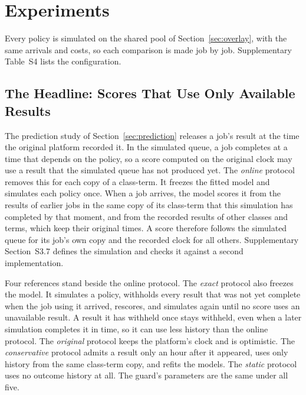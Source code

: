 \providecommand{\devnum}[1]{#1}

\section{Experiments}
\label{sec:experiments}
\label{sec:exp_setup}

Every policy is simulated on the shared pool of Section~\ref{sec:overlay}, with the same
arrivals and costs, so each comparison is made job by job. Supplementary Table~S4 lists the
configuration.

\subsection{The Headline: Scores That Use Only Available Results}
\label{sec:exp_visibility}

The prediction study of Section~\ref{sec:prediction} releases a job's result at the time the
original platform recorded it. In the simulated queue, a job completes at a time that
depends on the policy, so a score computed on the original clock may use a result that the
simulated queue has not produced yet. The \emph{online} protocol removes this for each copy
of a class-term. It freezes the fitted model and simulates each policy once. When a
job arrives, the model scores it from the results of earlier jobs in the same copy of its
class-term that this simulation has completed by that moment, and from the recorded results
of other classes and terms, which keep their original times. A score therefore follows the
simulated queue for its job's own copy and the recorded clock for all others. Supplementary Section~S3.7 defines the
simulation and checks it against a second implementation.

Four references stand beside the online protocol. The \emph{exact} protocol also freezes
the model. It simulates a policy, withholds every result that was not yet complete when the
job using it arrived, rescores, and simulates again until no score uses an unavailable
result. A result it has withheld once stays withheld, even when a later simulation
completes it in time, so it can use less history than the online protocol. The
\emph{original} protocol keeps the platform's clock and is optimistic. The
\emph{conservative} protocol admits a result only an hour after it appeared, uses only
history from the same class-term copy, and refits the models. The \emph{static} protocol
uses no outcome history at all. The guard's parameters are the same under all five.

